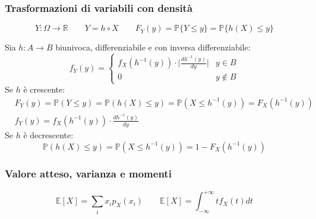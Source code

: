 \subsubsection{Trasformazioni di variabili con densità}
\begin{equation}
	Y:\Omega \to \mathbb{R} \quad \quad Y = h \circ X \quad\quad F_Y(y) = \mathbb{P}\{Y\leq y\} = \mathbb{P}\{h(X) \leq y\}
\end{equation}

\begin{proposition}
	Sia $h: A \to B$ biunivoca, differenziabile e con inversa differenziabile:
	\begin{equation}
		f_Y(y) = \begin{cases}
			f_X(h^{-1}(y)) \cdot \bigg\lvert \frac{dh^{-1}(y)}{dy} \bigg\rvert & y \in B\\
			0 & y \notin B
		\end{cases}
	\end{equation}
	Se $h$ è crescente:
	\begin{align}
		& F_Y(y)=\mathbb{P}(Y\leq y) = \mathbb{P}(h(X) \leq y) = \mathbb{P}(X \leq h^{-1}(y)) = F_X(h^{-1}(y))\\
		& f_Y(y)=f_X(h^{-1}(y))\cdot \frac{dh^{-1}(y)}{dy}
	\end{align}
	Se $h$ è decrescente:
	\begin{equation}
		\mathbb{P}(h(X) \leq y) = \mathbb{P}(X \leq h^{-1}(y)) = 1 - F_X(h^{-1}(y))
	\end{equation}
\end{proposition}

\subsubsection{Valore atteso, varianza e momenti}
\begin{definition}
	\begin{equation}
		\mathbb{E}[X] = \sum_i x_i p_X(x_i) \quad\quad \mathbb{E}[X] = \int_{-\infty}^{+\infty} tf_X(t)dt
	\end{equation}
\end{definition}

